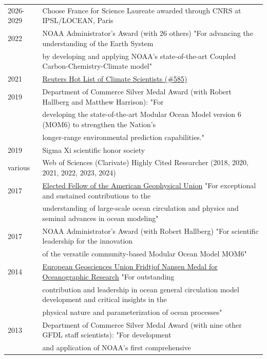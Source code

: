 \documentclass{article}
\begin{document}
\begin{tabular}{ll}
  2026-2029 & Choose France for Science Laureate awarded through CNRS at IPSL/LOCEAN, Paris
\\
  2022 & NOAA Administrator's Award (with 26 others) "For advancing the understanding of the Earth System \\ & by developing and applying NOAA's state-of-the-art Coupled Carbon-Chemistry-Climate model"
\\
  2021 & \href{https://app.dimensions.ai/details/entities/publication/author/ur.010052126545.52}{Reuters Hot List of Climate Scientists (\#585)} 
  \\
  2019 & Department of Commerce Silver Medal Award (with Robert Hallberg and Matthew Harrison): "For \\ &  developing the state-of-the-art Modular Ocean Model version 6 (MOM6) to strengthen the Nation's \\& longer-range environmental prediction capabilities."
  \\
  2019 & Sigma Xi scientific honor society 
  \\
  various  & Web of Sciences (Clarivate) Highly Cited Researcher (2018, 2020, 2021, 2022, 2023, 2024)
  \\
  2017 & \href{https://eos.org/agu-news/celebrating-the-2017-class-of-fellows}{Elected Fellow of the American Geophysical Union} "For exceptional and sustained contributions to the \\ &  understanding of large-scale ocean circulation and physics and seminal advances in ocean modeling"
\\
  2017 & NOAA Administrator's Award (with Robert Hallberg) "For scientific leadership for the innovation \\ & of the versatile  community-based Modular Ocean Model MOM6" 
  \\
  2014 & \href{http://www.egu.eu/awards-medals/fridtjof-nansen/2014/stephen-m-griffies/}{European Geosciences Union Fridtjof Nansen Medal for
         Oceanographic Research}  "For 
outstanding \\ & contribution and leadership in 
ocean general circulation model development 
and critical insights in the \\ & physical 
nature and parameterization of ocean processes"
\\
  2013 & Department of Commerce Silver Medal Award (with nine other
  GFDL staff scientists): 
  "For development \\ & and application of NOAA's first comprehensive  

\end{tabular}
\end{document}
